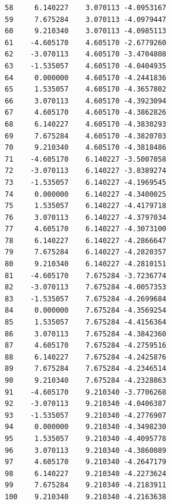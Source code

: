 \begin{verbatim}
58     6.140227    3.070113 -4.0953167
59     7.675284    3.070113 -4.0979447
60     9.210340    3.070113 -4.0985113
61    -4.605170    4.605170 -2.6779260
62    -3.070113    4.605170 -3.4704808
63    -1.535057    4.605170 -4.0404935
64     0.000000    4.605170 -4.2441836
65     1.535057    4.605170 -4.3657802
66     3.070113    4.605170 -4.3923094
67     4.605170    4.605170 -4.3862826
68     6.140227    4.605170 -4.3830293
69     7.675284    4.605170 -4.3820703
70     9.210340    4.605170 -4.3818486
71    -4.605170    6.140227 -3.5007058
72    -3.070113    6.140227 -3.8389274
73    -1.535057    6.140227 -4.1969545
74     0.000000    6.140227 -4.3400025
75     1.535057    6.140227 -4.4179718
76     3.070113    6.140227 -4.3797034
77     4.605170    6.140227 -4.3073100
78     6.140227    6.140227 -4.2866647
79     7.675284    6.140227 -4.2820357
80     9.210340    6.140227 -4.2810151
81    -4.605170    7.675284 -3.7236774
82    -3.070113    7.675284 -4.0057353
83    -1.535057    7.675284 -4.2699684
84     0.000000    7.675284 -4.3569254
85     1.535057    7.675284 -4.4156364
86     3.070113    7.675284 -4.3842360
87     4.605170    7.675284 -4.2759516
88     6.140227    7.675284 -4.2425876
89     7.675284    7.675284 -4.2346514
90     9.210340    7.675284 -4.2328863
91    -4.605170    9.210340 -3.7706268
92    -3.070113    9.210340 -4.0406387
93    -1.535057    9.210340 -4.2776907
94     0.000000    9.210340 -4.3498230
95     1.535057    9.210340 -4.4095778
96     3.070113    9.210340 -4.3860089
97     4.605170    9.210340 -4.2647179
98     6.140227    9.210340 -4.2273624
99     7.675284    9.210340 -4.2183911
100    9.210340    9.210340 -4.2163638
\end{verbatim}

